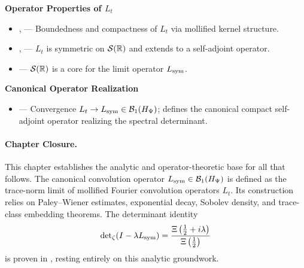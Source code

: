 \textbf{Operator Properties of \texorpdfstring{\( L_t \)}{Lt}}
\begin{itemize}
  \item {},  — Boundedness and compactness of \( L_t \) via mollified kernel structure.
  \item {},  — \( L_t \) is symmetric on \( \mathcal{S}(\mathbb{R}) \) and extends to a self-adjoint operator.
  \item {} — \( \mathcal{S}(\mathbb{R}) \) is a core for the limit operator \( L_{\mathrm{sym}} \).
\end{itemize}

\textbf{Canonical Operator Realization}
\begin{itemize}
  \item {} — Convergence \( L_t \to L_{\mathrm{sym}} \in \mathcal{B}_1(H_{\Psi}) \); defines the canonical compact self-adjoint operator realizing the spectral determinant.
\end{itemize}

\paragraph{Chapter Closure.}
This chapter establishes the analytic and operator-theoretic base for all that follows. The canonical convolution operator \( L_{\mathrm{sym}} \in \mathcal{B}_1(H_{\Psi}) \) is defined as the trace-norm limit of mollified Fourier convolution operators \( L_t \). Its construction relies on Paley--Wiener estimates, exponential decay, Sobolev density, and trace-class embedding theorems. The determinant identity
\[
\det\nolimits_{\zeta}(I - \lambda L_{\mathrm{sym}})
= \frac{\Xi\left(\tfrac{1}{2} + i\lambda \right)}{\Xi\left(\tfrac{1}{2} \right)}
\]
is proven in , resting entirely on this analytic groundwork.
